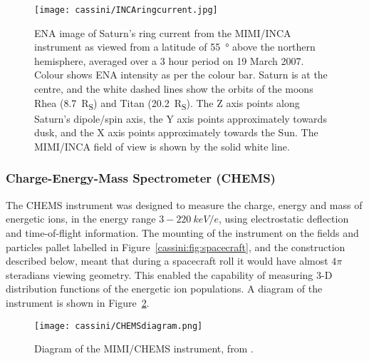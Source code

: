 \begin{figure}
\centering
\noindent\texttt{[image: cassini/INCAringcurrent.jpg]}
\caption[ENA image of Saturn's ring current from MIMI/INCA.]{ENA image of Saturn's ring current from the MIMI/INCA instrument as viewed from a latitude of \SI{55}{\degree} above the northern hemisphere, averaged over a 3 hour period on 19 March 2007. Colour shows ENA intensity as per the colour bar. Saturn is at the  centre, and the white dashed lines show the orbits of the moons Rhea (\SI{8.7}{R_S}) and Titan (\SI{20.2}{R_S}). The Z axis points along Saturn's dipole/spin axis, the Y axis points approximately towards dusk, and the X axis points approximately  towards the Sun. The MIMI/INCA field of view is shown by the solid white line.}
\label{cassini:fig:INCAringcurrent}
\end{figure}

\subsubsection{Charge-Energy-Mass Spectrometer (CHEMS)}
The CHEMS instrument was designed to measure the charge, energy and mass of energetic ions, in the energy range $3-\SI{220}{keV/e}$, using electrostatic deflection and time-of-flight information. The mounting of the instrument on the fields and particles pallet labelled in Figure~\ref{cassini:fig:spacecraft}, and the construction described below, meant that during a spacecraft roll it would have almost $4\pi$ steradians viewing geometry. This enabled the capability of measuring 3-D distribution functions of the energetic ion populations. A diagram of the instrument is shown in Figure~\ref{cassini:fig:CHEMSdiagram}.

\begin{figure}
\centering
\noindent\texttt{[image: cassini/CHEMSdiagram.png]}
\caption[Diagram of the MIMI/CHEMS instrument.]{Diagram of the MIMI/CHEMS instrument, from \citet{krimigis2004}.}
\label{cassini:fig:CHEMSdiagram}
\end{figure}

